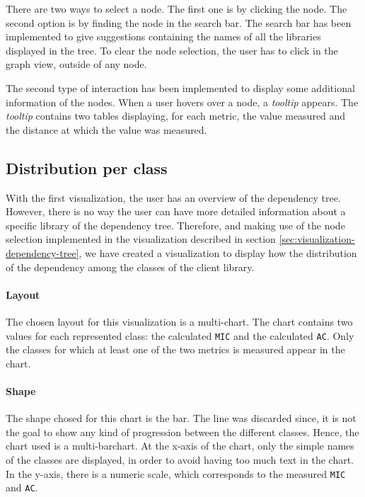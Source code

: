 There are two ways to select a node. The first one is by clicking the node. The second option is by finding the node in the search bar. The search bar has been implemented to give suggestions containing the names of all the libraries displayed in the tree. To clear the node selection, the user has to click in the graph view, outside of any node.

The second type of interaction has been implemented to display some additional information of the nodes. When a user hovers over a node, a \textit{tooltip} appears. The \textit{tooltip} contains two tables displaying, for each metric, the value measured and the distance at which the value was measured.

\subsection{Distribution per class}
With the first visualization, the user has an overview of the dependency tree. However, there is no way the user can have more detailed information about a specific library of the dependency tree. Therefore, and making use of the node selection implemented in the visualization described in section \ref{sec:visualization-dependency-tree}, we have created a visualization to display how the distribution of the dependency among the classes of the client library.

\paragraph{Layout}
The chosen layout for this visualization is a multi-chart. The chart contains two values for each represented class: the calculated \texttt{MIC} and the calculated \texttt{AC}. Only the classes for which at least one of the two metrics is measured appear in the chart. 

\paragraph{Shape}
The shape chosed for this chart is the bar. The line was discarded since, it is not the goal to show any kind of progression between the different classes. Hence, the chart used is a multi-barchart.
At the x-axis of the chart, only the simple names of the classes are displayed, in order to avoid having too much text in the chart. In the y-axis, there is a numeric scale, which corresponds to the measured \texttt{MIC} and \texttt{AC}.


